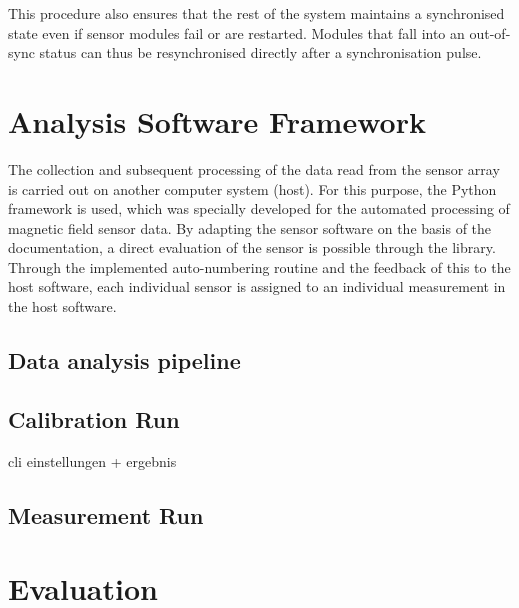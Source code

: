 \documentclass[conference]{IEEEtran}
\begin{document}
This procedure also ensures that the rest of the system maintains a synchronised state even if sensor modules fail or are restarted.
Modules that fall into an out-of-sync status can thus be resynchronised directly after a synchronisation pulse.


\section{Analysis Software Framework}

The collection and subsequent processing of the data read from the sensor array is carried out on another computer system (host).
For this purpose, the Python framework is used, which was specially developed for the automated processing of magnetic field sensor data.
By adapting the sensor software on the basis of the documentation, a direct evaluation of the sensor is possible through the library.
Through the implemented auto-numbering routine and the feedback of this to the host software, each individual sensor is assigned to an individual measurement in the host software.

\subsection{Data analysis pipeline}





\subsection{Calibration Run}

cli einstellungen
+ ergebnis

\subsection{Measurement Run}






\section{Evaluation}
\end{document}
